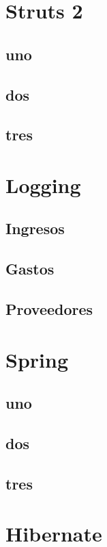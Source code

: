 \documentclass[12pt]{article}
\begin{document}
    \section{Struts 2}
    \newpage
		\subsection{uno}
		\newpage
		\subsection{dos}
		\newpage
		\subsection{tres}
		\newpage

    \section{Logging}
    \newpage
		\subsection{Ingresos}
		\newpage
		\subsection{Gastos}
		\newpage
		\subsection{Proveedores}
		\newpage

    \section{Spring}
    \newpage
		\subsection{uno}
		\newpage
		\subsection{dos}
		\newpage
		\subsection{tres}
		\newpage


    \section{Hibernate}
    \newpage
\end{document}
